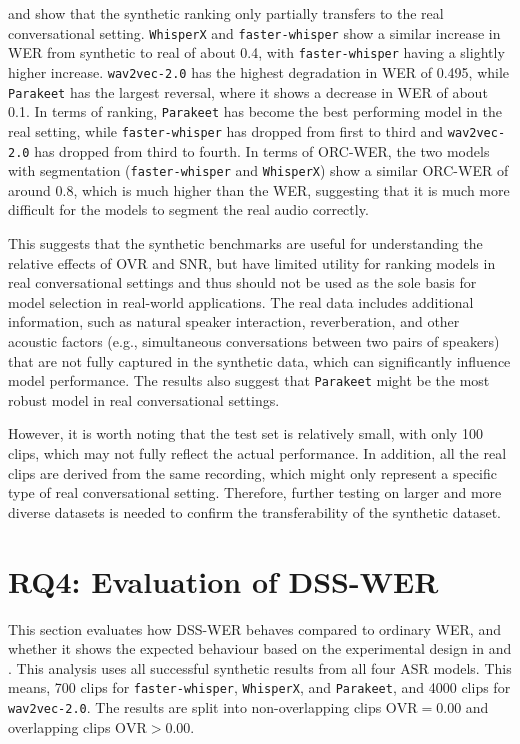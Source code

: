  and  show that the synthetic ranking only partially transfers to the real conversational setting. \texttt{WhisperX} and \texttt{faster-whisper} show a similar increase in WER from synthetic to real of about 0.4, with \texttt{faster-whisper} having a slightly higher increase. \texttt{wav2vec-2.0} has the highest degradation in WER of 0.495, while \texttt{Parakeet} has the largest reversal, where it shows a decrease in WER of about 0.1. In terms of ranking, \texttt{Parakeet} has become the best performing model in the real setting, while \texttt{faster-whisper} has dropped from first to third and \texttt{wav2vec-2.0} has dropped from third to fourth. In terms of ORC-WER, the two models with segmentation (\texttt{faster-whisper} and \texttt{WhisperX}) show a similar ORC-WER of around 0.8, which is much higher than the WER, suggesting that it is much more difficult for the models to segment the real audio correctly.

This suggests that the synthetic benchmarks are useful for understanding the relative effects of OVR and SNR, but have limited utility for ranking models in real conversational settings and thus should not be used as the sole basis for model selection in real-world applications. The real data includes additional information, such as natural speaker interaction, reverberation, and other acoustic factors (e.g., simultaneous conversations between two pairs of speakers) that are not fully captured in the synthetic data, which can significantly influence model performance. The results also suggest that \texttt{Parakeet} might be the most robust model in real conversational settings.

However, it is worth noting that the test set is relatively small, with only 100 clips, which may not fully reflect the actual performance. In addition, all the real clips are derived from the same recording, which might only represent a specific type of real conversational setting. Therefore, further testing on larger and more diverse datasets is needed to confirm the transferability of the synthetic dataset.

\section{RQ4: Evaluation of DSS-WER}
\label{sec:rq4_evaluation_of_dss_wer}

This section evaluates how DSS-WER behaves compared to ordinary WER, and whether it shows the expected behaviour based on the experimental design in  and . This analysis uses all successful synthetic results from all four ASR models. This means, 700 clips for \texttt{faster-whisper}, \texttt{WhisperX}, and \texttt{Parakeet}, and 4000 clips for \texttt{wav2vec-2.0}. The results are split into non-overlapping clips $\mathrm{OVR} = 0.00$ and overlapping clips $\mathrm{OVR} > 0.00$.

